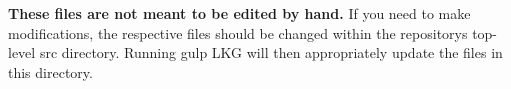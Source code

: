 {\bfseries{These files are not meant to be edited by hand.}} If you need to make modifications, the respective files should be changed within the repository\textquotesingle{}s top-\/level {\ttfamily src} directory. Running {\ttfamily gulp LKG} will then appropriately update the files in this directory. 